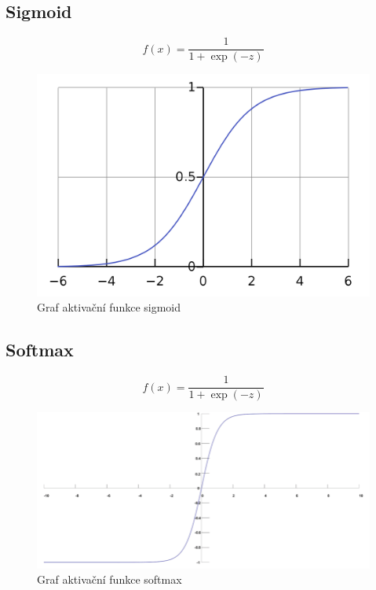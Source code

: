 \subsection*{Sigmoid}
\begin{equation}
  f(x) = \frac{1}{1+\exp(-z)}
\end{equation}
\begin{figure}[H]
    \centering
    \includegraphics[scale=0.2]{obrazky-figures/sigmoid.png}
    \caption{\label{fig:sigmoid}Graf aktivační funkce sigmoid}
\end{figure}

\subsection*{Softmax}
\begin{equation}
  f(x) = \frac{1}{1+\exp(-z)}
\end{equation}
\begin{figure}[H]
    \centering
    \includegraphics[scale=0.2]{obrazky-figures/softmax.png}
    \caption{\label{fig:softmax}Graf aktivační funkce softmax}
\end{figure}

